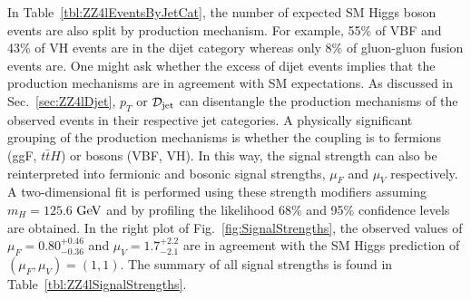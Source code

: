 In Table~\ref{tbl:ZZ4lEventsByJetCat}, the number of expected SM Higgs boson events are also split by production mechanism. For example, 55\% of VBF and 43\% of VH events are in the dijet category whereas only 8\% of gluon-gluon fusion events are. One might ask whether the excess of dijet events implies that the production mechanisms are in agreement with SM expectations. As discussed in Sec.~\ref{sec:ZZ4lDjet}, $p_T$ or $\mathcal{D}_{\rm jet}$ can disentangle the production mechanisms of the observed events in their respective jet categories. A physically significant grouping of the production mechanisms is whether the coupling is to fermions (ggF, $t\bar{t}H$) or bosons (VBF, VH). In this way, the signal strength can also be reinterpreted into fermionic and bosonic signal strengths, $\mu_{F}$ and $\mu_{V}$ respectively. A two-dimensional fit is performed using these strength modifiers assuming $m_H=125.6$ $\rm{GeV}$ and by profiling the likelihood 68\% and 95\% confidence levels are obtained. In the right plot of Fig.~\ref{fig:SignalStrengths}, the observed values of $\mu_F = 0.80^{+0.46}_{-0.36}$ and $\mu_V=1.7^{+2.2}_{-2.1}$ are in agreement with the SM Higgs prediction of $(\mu_F,\mu_V) = (1,1)$. The summary of all signal strengths is found in Table~\ref{tbl:ZZ4lSignalStrengths}.

